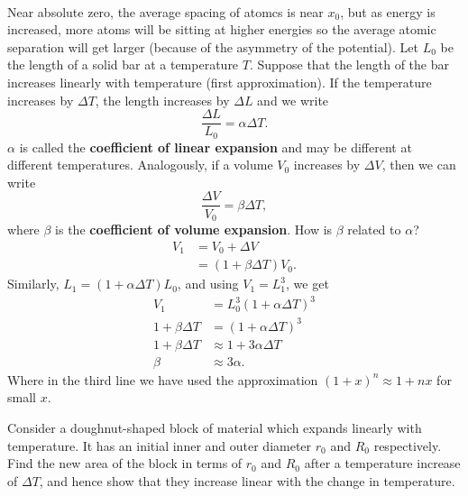 \documentclass[../thermodynamics.tex]{subfiles}
\begin{document}
        \paragraph{}
        Near absolute zero, the average spacing of atomcs is near $x_0$, but as energy is increased, more atoms will be sitting at higher energies so the average atomic separation will get larger (because of the asymmetry of the potential).
        Let $L_0$ be the length of a solid bar at a temperature $T$.
        Suppose that the length of the bar increases linearly with temperature (first approximation).
        If the temperature increases by $\Delta T$, the length increases by $\Delta L$ and we write
        \begin{equation}
            \frac{\Delta L}{L_0}=\alpha\Delta T.
        \end{equation}
        $\alpha$ is called the \textbf{coefficient of linear expansion} and may be different at different temperatures.
        Analogously, if a volume $V_0$ increases by $\Delta V$, then we can write
        \begin{equation}
            \frac{\Delta V}{V_0}=\beta\Delta T,
        \end{equation}
        where $\beta$ is the \textbf{coefficient of volume expansion}.
        How is $\beta$ related to $\alpha$?
        \begin{align}
            V_1&=V_0+\Delta V\\
            &=(1+\beta\Delta T)V_0.
        \end{align}
        Similarly, $L_1=(1+\alpha\Delta T)L_0$, and using $V_1=L_1^3$, we get
        \begin{align}
            V_1&=L_0^3(1+\alpha\Delta T)^3\\
            1+\beta\Delta T&=(1+\alpha\Delta T)^3\\
            1+\beta\Delta T&\approx 1+3\alpha\Delta T\\
            \beta&\approx 3\alpha.
        \end{align}
        Where in the third line we have used the approximation $(1+x)^n\approx 1+nx$ for small $x$.
        \begin{example}
            Consider a doughnut-shaped block of material which expands linearly with temperature.
            It has an initial inner and outer diameter $r_0$ and $R_0$ respectively.
            Find the new area of the block in terms of $r_0$ and $R_0$ after a temperature increase of $\Delta T$, and hence show that they increase linear with the change in temperature.
        \end{example}
\end{document}
